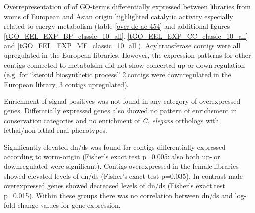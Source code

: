 Overrepresentation of of GO-terms differentially expressed between
libraries from woms of European and Asian origin highlighted catalytic
activity especially related to energy metabolism
(table \ref{over-de-ae-454} and additional figures
\ref{tGO_EEL_EXP_BP_classic_10_all},
\ref{tGO_EEL_EXP_CC_classic_10_all} and
\ref{tGO_EEL_EXP_MF_classic_10_all}).  Acyltransferase contigs were
all upregulated in the European libraries. However, the expression
patterns for other contigs connected to metabolsim did not show
concerted up or down-regulation (e.g. for ``steroid biosynthetic
process'' 2 contigs were downregulated in the European library, 3
contigs upregulated).

Enrichment of signal-positives was not found in any category of
overexpressed genes. Differntially expressed genes also showed no
pattern of enrichement in conservation categories and no enrichment of
\textit{C. elegans} orthologs with lethal/non-lethal rnai-phenotypes.

Significantly elevated dn/ds was found for contigs differentially
expressed according to worm-origin (Fisher's exact test p=0.005; also
both up- or downregulated were significant). Contigs overexpressed in
the female libraries showed elevated levels of dn/ds (Fisher's exact
test p=0.035). In contrast male overexpressed genes showed decreased
levels of dn/ds (Fisher's exact test p=0.015). Within these groups
there was no correlation between dn/ds and log-fold-change values for
gene-expression.


